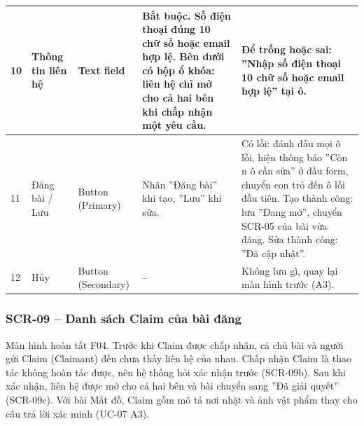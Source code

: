 \begin{longtable}{|p{}|p{}|p{}|p{}|p{}|}
10 & Thông tin liên hệ & Text field & Bắt buộc. Số điện thoại đúng 10 chữ số hoặc email hợp lệ. Bên dưới có hộp ổ khóa: liên hệ chỉ mở cho cả hai bên khi chấp nhận một yêu cầu. & Để trống hoặc sai: ''Nhập số điện thoại 10 chữ số hoặc email hợp lệ'' tại ô. \\ \hline
11 & Đăng bài / Lưu & Button (Primary) & Nhãn ''Đăng bài'' khi tạo, ''Lưu'' khi sửa. & Có lỗi: đánh dấu mọi ô lỗi, hiện thông báo ''Còn n ô cần sửa'' ở đầu form, chuyển con trỏ đến ô lỗi đầu tiên. Tạo thành công: lưu ''Đang mở'', chuyển SCR-05 của bài vừa đăng. Sửa thành công: ''Đã cập nhật''. \\ \hline
12 & Hủy & Button (Secondary) & -- & Không lưu gì, quay lại màn hình trước (A3). \\ \hline
\end{longtable}

\subsubsection{SCR-09 -- Danh sách Claim của bài đăng}

Màn hình hoàn tất F04. Trước khi Claim được chấp nhận, cả chủ bài và người gửi Claim (Claimant) đều chưa thấy liên hệ của nhau. Chấp nhận Claim là thao tác không hoàn tác được, nên hệ thống hỏi xác nhận trước (SCR-09b). Sau khi xác nhận, liên hệ được mở cho cả hai bên và bài chuyển sang ''Đã giải quyết'' (SCR-09c). Với bài Mất đồ, Claim gồm mô tả nơi nhặt và ảnh vật phẩm thay cho câu trả lời xác minh (UC-07 A3).

